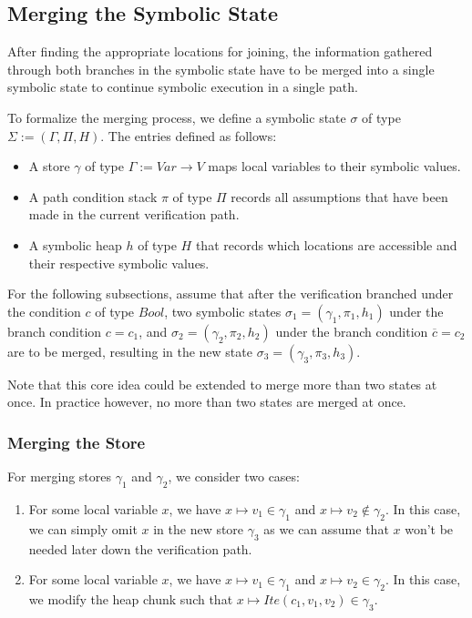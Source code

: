 \documentclass[11pt]{article}
\begin{document}
    \subsection{Merging the Symbolic State} \label{merging-the-symbolic-state}
    
    After finding the appropriate locations for joining, the information
    gathered through both branches in the symbolic state have to be merged
    into a single symbolic state to continue symbolic execution in a single
    path.

    To formalize the merging process, we define
    a symbolic state $\sigma$ of type $\Sigma := (\Gamma, \Pi, H)$. The entries
    defined as follows:

    \begin{itemize}
        \item A store $\gamma$ of type $\Gamma := Var \to V$ maps local variables to their symbolic values.
        \item A path condition stack $\pi$ of type $\Pi$ records all assumptions that have been made in the current verification path.
        \item A symbolic heap $h$ of type $H$ that records which locations are accessible and their respective symbolic values.
    \end{itemize}

    For the following subsections, assume that after the verification branched under the condition $c$ of type $Bool$,
    two symbolic states $\sigma_1 = (\gamma_1, \pi_1, h_1)$ under the branch condition $c = c_1$, and
    $\sigma_2 = (\gamma_2, \pi_2, h_2)$ under the branch condition $\overline{c} = c_2$ are to be merged,
    resulting in the new state $\sigma_3 = (\gamma_3, \pi_3, h_3)$.

    Note that this core idea could be extended to merge more than two states at once. In practice however,
    no more than two states are merged at once.

    \subsubsection{Merging the Store}

    For merging stores $\gamma_1$ and $\gamma_2$, we consider two cases:

    \begin{enumerate}
        \item For some local variable $x$, we have $x \mapsto v_1 \in \gamma_1$ and $x \mapsto v_2 \notin \gamma_2$.
            In this case, we can simply omit $x$ in the new store $\gamma_3$ as we can assume that $x$ won't
            be needed later down the verification path.
        \item For some local variable $x$, we have $x \mapsto v_1 \in \gamma_1$ and $x \mapsto v_2 \in \gamma_2$.
            In this case, we modify the heap chunk such that $x \mapsto Ite(c_1, v_1, v_2) \in \gamma_3$.
    \end{enumerate}
\end{document}
